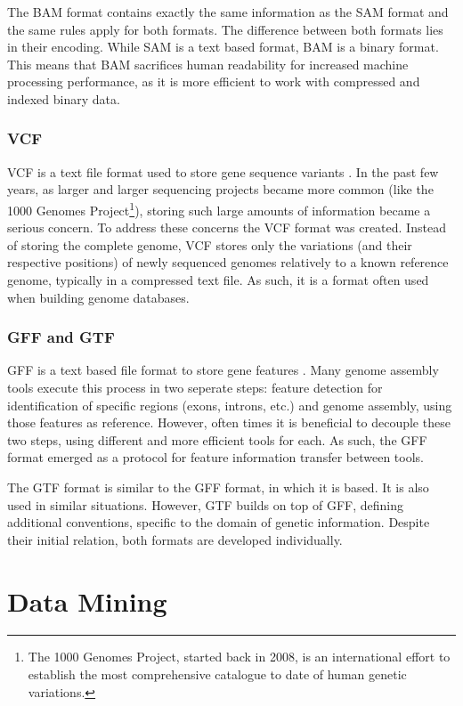 The BAM format contains exactly the same information as the SAM format and the
same rules apply for both formats. The difference between both formats lies in
their encoding. While SAM is a text based format, BAM is a binary format. This
means that BAM sacrifices human readability for increased machine processing
performance, as it is more efficient to work with compressed and indexed binary
data.

\subsubsection*{VCF}

VCF is a text file format used to store gene sequence variants \cite{smith13}.
In the past few years, as larger and larger \dna{} sequencing projects became
more common (like the 1000 Genomes Project\footnote{The 1000 Genomes Project,
started back in 2008, is an international effort to establish the most
comprehensive catalogue to date of human genetic variations.}), storing such
large amounts of information became a serious concern. To address these concerns
the VCF format was created. Instead of storing the complete genome, VCF stores
only the variations (and their respective positions) of newly sequenced genomes
relatively to a known reference genome, typically in a compressed text file. As
such, it is a format often used when building genome databases.

\subsubsection*{GFF and GTF}

GFF is a text based file format to store gene features \cite{sanger11}. Many
genome assembly tools execute this process in two seperate steps: feature
detection for identification of specific regions (exons, introns, etc.) and
genome assembly, using those features as reference. However, often times it is
beneficial to decouple these two steps, using different and more efficient tools
for each. As such, the GFF format emerged as a protocol for feature information
transfer between tools.

The GTF format is similar to the GFF format, in which it is based. It is also
used in similar situations. However, GTF builds on top of GFF, defining
additional conventions, specific to the domain of genetic information. Despite
their initial relation, both formats are developed individually.

\section{Data Mining}\label{sec:mlearning}

